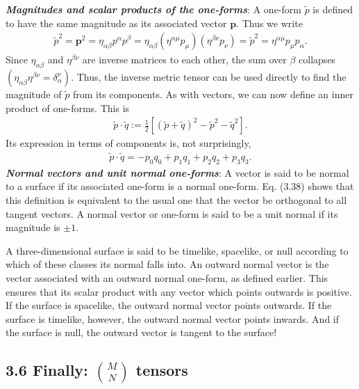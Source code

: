 \documentclass[12pt]{book}
\begin{document}
    \textit{\textbf{Magnitudes and scalar products of the one-forms}}: 
    A one-form \(\tilde{p}\) is defined to have the same magnitude as its associated vector \(\mathbf{p}\). Thus we write
    \begin{align}
    \tilde{p}^2 = \mathbf{p}^2 = \eta_{\alpha\beta} p^\alpha p^\beta = \eta_{\alpha\beta} (\eta^{\alpha\mu} p_\mu)(\eta^{\beta\nu} p_\nu) = \tilde{p}^2 = \eta^{\alpha\mu} p_\mu p_\alpha. \tag{3.50}
    \end{align}
    Since \(\eta_{\alpha\beta}\) and \(\eta^{\beta\nu}\) are inverse matrices to each other, the sum over \(\beta\) collapses \((\eta_{\alpha\beta}\eta^{\beta\nu} = \delta^\nu_\alpha)\). Thus, the inverse metric tensor can be used directly to find the magnitude of \(\tilde{p}\) from its components.
    As with vectors, we can now define an inner product of one-forms. This is
    \begin{align}
    \tilde{p} \cdot \tilde{q} := \frac{1}{2} \left[ (\tilde{p} + \tilde{q})^2 - \tilde{p}^2 - \tilde{q}^2 \right]. \tag{3.52}
    \end{align}
    Its expression in terms of components is, not surprisingly,
    \begin{align}
    \tilde{p} \cdot \tilde{q} = -p_0 q_0 + p_1 q_1 + p_2 q_2 + p_3 q_3. \tag{3.53}
    \end{align}
    \textit{\textbf{Normal vectors and unit normal one-forms}}:
    A vector is said to be normal to a surface if its associated one-form is a normal one-form. Eq. (3.38) shows that this definition is equivalent to the usual one that the vector be orthogonal to all tangent vectors. A normal vector or one-form is said to be a unit normal if its magnitude is \(\pm 1\).

    A three-dimensional surface is said to be timelike, spacelike, or null according to which of these classes its normal falls into. An outward normal vector is the vector associated with an outward normal one-form, as defined earlier. This ensures that its scalar product with any vector which points outwards is positive. If the surface is spacelike, the outward normal vector points outwards. If the surface is timelike, however, the outward normal vector points inwards. And if the surface is null, the outward vector is tangent to the surface!

    \subsection{3.6 Finally: \(\binom{M}{N}\) tensors}
\end{document}
